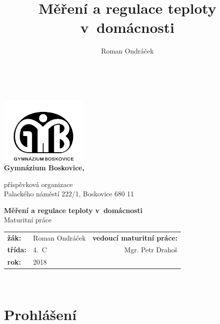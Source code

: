 \documentclass[12pt,a4paper]{article}
\author{Roman Ondráček}
\title{Měření a regulace teploty v~domácnosti}
\begin{document}
\renewcommand{\baselinestretch}{1.5}
\pagestyle{empty}

\begin{center}

~ \vspace{64pt}

\includegraphics[width = 160px]{../img/gymbos-logo.png}  \\[8pt]

{\LARGE \textbf{Gymnázium Boskovice,} \\}

\begin{large}
příspěvková organizace \\
Palackého náměstí 222/1, Boskovice 680 11 \\
\end{large}

\vspace{64pt}

{\huge \textbf{Měření a regulace teploty v~domácnosti} \\}
{\LARGE Maturitní práce \\}

\vspace{64pt}

\begin{large}
\begin{tabular}{llr}
\textbf{žák:} & Roman Ondráček & \textbf{vedoucí maturitní práce:} \\
\textbf{třída:} & 4.~C & Mgr. Petr Drahoš \\
\textbf{rok:} & 2018 &  \\
\end{tabular}
\end{large}

\end{center}

\newpage

~ \vspace{160mm}

\section*{Prohlášení}
\end{document}
